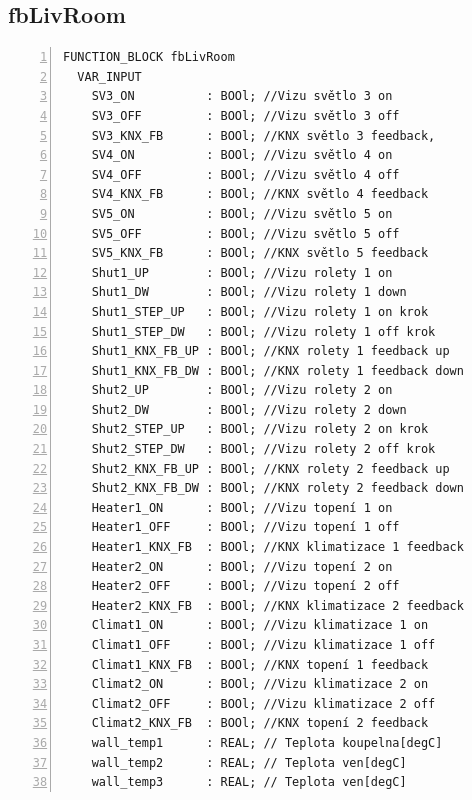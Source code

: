 \subsection{fbLivRoom}
\label{apend:fbLivRoom}
\begin{lstlisting}[language=ST, breaklines=true, numbers=left, numberstyle=\small, numbersep=10pt, frame=single, basicstyle=\ttfamily\small, caption={fbLivRoom}, label={lst:fbLivRoom}]
FUNCTION_BLOCK fbLivRoom
  VAR_INPUT
    SV3_ON          : BOOl; //Vizu světlo 3 on
    SV3_OFF         : BOOl; //Vizu světlo 3 off
    SV3_KNX_FB      : BOOl; //KNX světlo 3 feedback,
    SV4_ON          : BOOl; //Vizu světlo 4 on
    SV4_OFF         : BOOl; //Vizu světlo 4 off
    SV4_KNX_FB      : BOOl; //KNX světlo 4 feedback
    SV5_ON          : BOOl; //Vizu světlo 5 on
    SV5_OFF         : BOOl; //Vizu světlo 5 off
    SV5_KNX_FB      : BOOl; //KNX světlo 5 feedback
    Shut1_UP        : BOOl; //Vizu rolety 1 on
    Shut1_DW        : BOOl; //Vizu rolety 1 down
    Shut1_STEP_UP   : BOOl; //Vizu rolety 1 on krok
    Shut1_STEP_DW   : BOOl; //Vizu rolety 1 off krok
    Shut1_KNX_FB_UP : BOOl; //KNX rolety 1 feedback up
    Shut1_KNX_FB_DW : BOOl; //KNX rolety 1 feedback down
    Shut2_UP        : BOOl; //Vizu rolety 2 on
    Shut2_DW        : BOOl; //Vizu rolety 2 down
    Shut2_STEP_UP   : BOOl; //Vizu rolety 2 on krok
    Shut2_STEP_DW   : BOOl; //Vizu rolety 2 off krok
    Shut2_KNX_FB_UP : BOOl; //KNX rolety 2 feedback up
    Shut2_KNX_FB_DW : BOOl; //KNX rolety 2 feedback down
    Heater1_ON      : BOOl; //Vizu topení 1 on
    Heater1_OFF     : BOOl; //Vizu topení 1 off
    Heater1_KNX_FB  : BOOl; //KNX klimatizace 1 feedback
    Heater2_ON      : BOOl; //Vizu topení 2 on
    Heater2_OFF     : BOOl; //Vizu topení 2 off
    Heater2_KNX_FB  : BOOl; //KNX klimatizace 2 feedback
    Climat1_ON      : BOOl; //Vizu klimatizace 1 on
    Climat1_OFF     : BOOl; //Vizu klimatizace 1 off
    Climat1_KNX_FB  : BOOl; //KNX topení 1 feedback
    Climat2_ON      : BOOl; //Vizu klimatizace 2 on
    Climat2_OFF     : BOOl; //Vizu klimatizace 2 off
    Climat2_KNX_FB  : BOOl; //KNX topení 2 feedback
    wall_temp1      : REAL; // Teplota koupelna[degC]
    wall_temp2      : REAL; // Teplota ven[degC]
    wall_temp3      : REAL; // Teplota ven[degC]
\end{lstlisting}
